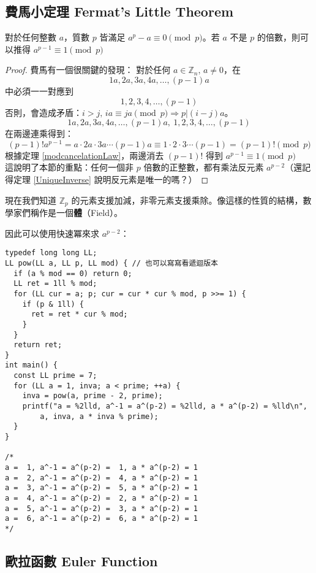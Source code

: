 \subsection{費馬小定理 Fermat's Little Theorem}
\label{sec:mod:FLT}
\begin{theorem}[費馬小定理]
對於任何整數 $a$，質數 $p$ 皆滿足 $a^p-a\equiv 0\pmod p$。若 $a$ 不是 $p$ 的倍數，則可以推得 $a^{p-1} \equiv 1\pmod p$
\end{theorem}
\begin{proof}
費馬有一個很關鍵的發現：
對於任何 $a\in \mathbb Z_n,\,a\neq 0$，在
$$1a,2a,3a,4a,\ldots,(p-1)a $$ 中必須一一對應到 $$1,2,3,4,\ldots,(p-1)$$
否則，會造成矛盾：$i>j,\,ia\equiv ja\pmod p\Rightarrow p|(i-j)a$。
$$1a,2a,3a,4a,\ldots,(p-1)a ,\ 1,2,3,4,\ldots,(p-1)$$
在兩邊連乘得到：
$$(p-1)!a^{p-1}=a\cdot 2a \cdot 3a\cdots (p-1)a\equiv 1\cdot 2\cdot 3\cdots (p-1)=(p-1)! \pmod p$$
根據定理 \ref{modcancelationLaw}，兩邊消去 $(p-1)!$ 得到 $a^{p-1}\equiv 1\pmod p$\\
這說明了本節的重點：任何一個非 $p$ 倍數的正整數，都有乘法反元素 $a^{p-2}$（還記得定理 \ref{UniqueInverse} 說明反元素是唯一的嗎？）
\end{proof}

現在我們知道 $\mathbb Z_p$ 的元素支援加減，非零元素支援乘除。像這樣的性質的結構，數學家們稱作是一個\textbf{體}（Field）。

因此可以使用快速冪來求 $a^{p-2}$：

\begin{lstlisting}[caption=快速冪求反元素]
typedef long long LL;
LL pow(LL a, LL p, LL mod) { // 也可以寫寫看遞迴版本
  if (a % mod == 0) return 0;
  LL ret = 1ll % mod;
  for (LL cur = a; p; cur = cur * cur % mod, p >>= 1) {
    if (p & 1ll) {
      ret = ret * cur % mod;
    }
  }
  return ret;
}
int main() {
  const LL prime = 7;
  for (LL a = 1, inva; a < prime; ++a) {
    inva = pow(a, prime - 2, prime);
    printf("a = %2lld, a^-1 = a^(p-2) = %2lld, a * a^(p-2) = %lld\n",
        a, inva, a * inva % prime);
  }
}

/*
a =  1, a^-1 = a^(p-2) =  1, a * a^(p-2) = 1
a =  2, a^-1 = a^(p-2) =  4, a * a^(p-2) = 1
a =  3, a^-1 = a^(p-2) =  5, a * a^(p-2) = 1
a =  4, a^-1 = a^(p-2) =  2, a * a^(p-2) = 1
a =  5, a^-1 = a^(p-2) =  3, a * a^(p-2) = 1
a =  6, a^-1 = a^(p-2) =  6, a * a^(p-2) = 1
*/
\end{lstlisting}


\subsection{歐拉函數 Euler Function}
\label{sec:mod:eu}

